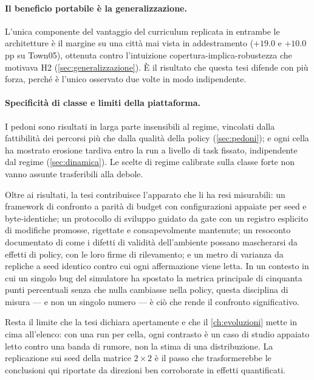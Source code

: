 \paragraph{Il beneficio portabile è la generalizzazione.}
L'unica componente del vantaggio del curriculum replicata in entrambe le
architetture è il margine su una città mai vista in addestramento
($+19.0$ e $+10.0$\,pp su Town05), ottenuta contro l'intuizione
copertura-implica-robustezza che motivava H2
(\cref{sec:generalizzazione}). È il risultato che questa tesi difende
con più forza, perché è l'unico osservato due volte in modo
indipendente.

\paragraph{Specificità di classe e limiti della piattaforma.}
I pedoni sono risultati in larga parte insensibili al regime, vincolati
dalla fattibilità dei percorsi più che dalla qualità della policy
(\cref{sec:pedoni}); e ogni cella ha mostrato erosione tardiva entro la
run a livello di task fissato, indipendente dal regime
(\cref{sec:dinamica}). Le scelte di regime calibrate sulla classe forte
non vanno assunte trasferibili alla debole.

\bigskip

Oltre ai risultati, la tesi contribuisce l'apparato che li ha resi
misurabili: un framework di confronto a parità di budget con
configurazioni appaiate per seed e byte-identiche; un protocollo di
sviluppo guidato da gate con un registro esplicito di modifiche
promosse, rigettate e consapevolmente mantenute; un resoconto
documentato di come i difetti di validità dell'ambiente possano
mascherarsi da effetti di policy, con le loro firme di rilevamento; e un
metro di varianza da repliche a seed identico contro cui ogni
affermazione viene letta. In un contesto in cui un singolo bug del
simulatore ha spostato la metrica principale di cinquanta punti
percentuali senza che nulla cambiasse nella policy, questa disciplina di
misura --- e non un singolo numero --- è ciò che rende il confronto
significativo.

Resta il limite che la tesi dichiara apertamente e che il
\cref{ch:evoluzioni} mette in cima all'elenco: con una run per cella,
ogni contrasto è un caso di studio appaiato letto contro una banda di
rumore, non la stima di una distribuzione. La replicazione sui seed
della matrice $2\times2$ è il passo che trasformerebbe le conclusioni
qui riportate da direzioni ben corroborate in effetti quantificati.
